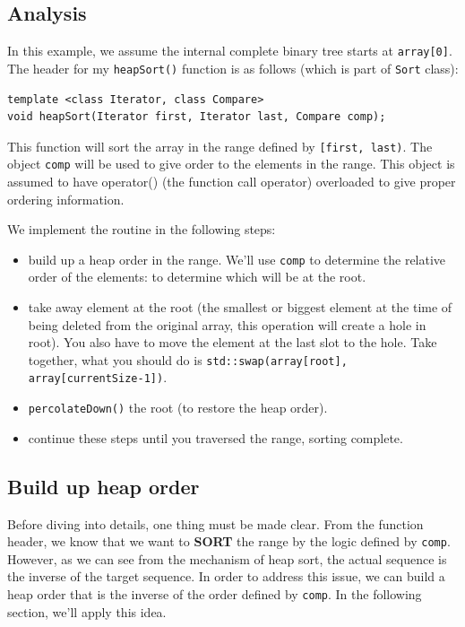 \documentclass[12pt]{book}
\begin{document}
\subsection{Analysis}
\label{sec:orgf682a02}

In this example, we assume the internal complete binary tree starts at \texttt{array[0]}.
The header for my \texttt{heapSort()} function is as follows (which is part of \texttt{Sort} class):
\begin{verbatim}
template <class Iterator, class Compare>
void heapSort(Iterator first, Iterator last, Compare comp);
\end{verbatim}
This function will sort the array in the range defined by \texttt{[first, last)}. The object \texttt{comp} will be used to give order to the elements in the range. This object is assumed to have operator() (the function call operator) overloaded to give proper ordering information.

We implement the routine in the following steps:
\begin{itemize}
\item build up a heap order in the range. We'll use \texttt{comp} to determine the relative order of the elements: to determine which will be at the root.
\item take away element at the root (the smallest or biggest element at the time of being deleted from the original array, this operation will create a hole in root). You also have to move the element at the last slot to the hole. Take together, what you should do is \texttt{std::swap(array[root], array[currentSize-1])}.
\item \texttt{percolateDown()} the root (to restore the heap order).
\item continue these steps until you traversed the range, sorting complete.
\end{itemize}
\subsection{Build up heap order}
\label{sec:org376ac3a}

Before diving into details, one thing must be made clear. From the function header, we know that we want to \textbf{SORT} the range by the logic defined by \texttt{comp}. However, as we can see from the mechanism of heap sort, the actual sequence is the inverse of the target sequence. In order to address this issue, we can build a heap order that is the inverse of the order defined by \texttt{comp}. In the following section, we'll apply this idea.
\end{document}
